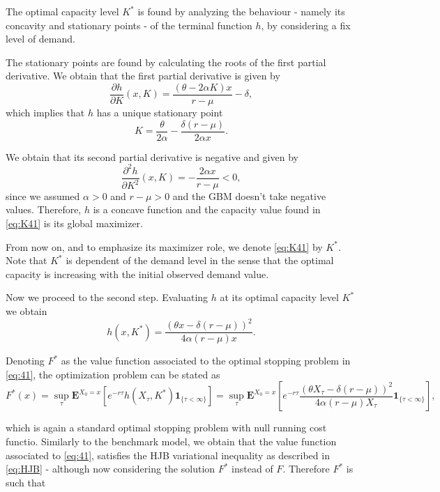 The optimal capacity level $K^*$ is found by analyzing the behaviour - namely its concavity and stationary points - of the terminal function $h$, by considering a fix level of demand.

The stationary points are found by calculating the roots of the first partial derivative.
We obtain that the  first partial derivative is given by
$$\frac{\partial h }{\partial K}(x,K)=  \frac{(\theta-2\alpha K)x}{r-\mu} - \delta, $$
which implies that $h$ has a unique stationary point
\begin{equation}
K=\frac{\theta}{2\alpha}-\frac{\delta (r-\mu)}{2 \alpha x}. 
\label{eq:K41}
\end{equation}

We obtain that its second partial derivative is negative and given by
$$\frac{\partial^2 h }{\partial K^2}(x,K)=  -\frac{2\alpha x}{r-\mu}<0, $$
since we assumed $\alpha>0$ and $r-\mu>0$ and the GBM doesn't take negative values. Therefore, $h$ is a concave function and the capacity value found in \eqref{eq:K41} is its global maximizer.

From now on, and to emphasize its maximizer role, we denote \eqref{eq:K41} by $K^*$.
Note that $K^*$ is dependent of the demand level in the sense that the optimal capacity is increasing with the initial observed demand value.

Now we proceed to the second step. Evaluating $h$ at its optimal capacity level $K^*$ we obtain
$$h(x,K^*)=\frac{(\theta x -\delta (r-\mu))^2}{4 \alpha (r-\mu) x}.$$

Denoting $F^*$ as the value function associated to the optimal stopping problem in \eqref{eq:41}, the optimization problem can be stated as
\begin{equation}
F^*(x)=\sup_\tau \textbf{E}^{X_0=x}\left[ e^{-r\tau}h(X_\tau,K^*) \textbf{1}_{\{\tau<\infty\}} \right]
= \sup_\tau \textbf{E}^{X_0=x}\left[ e^{-r\tau} \frac{(\theta X_\tau -\delta (r-\mu))^2}{4 \alpha (r-\mu) X_\tau} \textbf{1}_{\{\tau<\infty\}}\right],
\label{eq:41}
\end{equation}

which is again a standard optimal stopping problem with null running cost functio. Similarly to the benchmark model, we obtain that the value function associated to \eqref{eq:41}, satisfies the HJB variational inequality as described in \eqref{eq:HJB} - although now considering the solution $F^*$ instead of $F$. Therefore $F^*$ is such that

